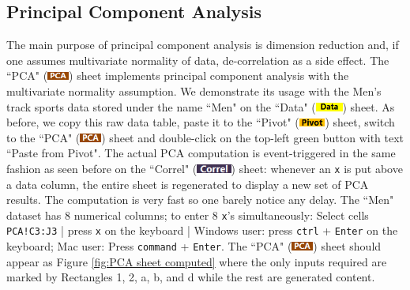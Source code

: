 \documentclass[article]{jss}
\numberwithin{equation}{subsection}
\newcommand{\shtData}{``Data" (\includegraphics[height=8pt, keepaspectratio=true]{img/DataSheetTab_png}) }
\newcommand{\shtPivot}{``Pivot" (\includegraphics[height=8pt, keepaspectratio=true]{img/PivotSheetTab_png}) }
\newcommand{\shtCorrel}{``Correl" (\includegraphics[height=8pt, keepaspectratio=true]{img/CorrelSheetTab_png}) }
\newcommand{\shtPCA}{``PCA" (\includegraphics[height=8pt, keepaspectratio=true]{img/PcaSheetTab_png}) }
\begin{document}
        \subsection[egPCA]{Principal Component Analysis}
        The main purpose of principal component analysis is dimension reduction and, if one assumes multivariate normality of data, de-correlation as a side effect. The \shtPCA sheet implements principal component analysis with the multivariate normality assumption.        
        We demonstrate its usage with the Men's track sports data stored under the name ``Men" on the \shtData sheet. As before, we copy this raw data table, paste it to the \shtPivot sheet, switch to the \shtPCA sheet and double-click on the top-left green button with text ``Paste from Pivot". The actual PCA computation is event-triggered in the same fashion as seen before on the \shtCorrel sheet: whenever an \texttt{x} is put above a data column, the entire sheet is regenerated to display a new set of PCA results. The computation is very fast so one barely notice any delay. The ``Men" dataset has 8 numerical columns; to enter 8 \texttt{x}'s simultaneously: Select cells \texttt{PCA!C3:J3} | press \texttt{x} on the keyboard | Windows user: press \texttt{ctrl} + \texttt{Enter} on the keyboard; Mac user: Press \texttt{command} + \texttt{Enter}. The \shtPCA sheet should appear as Figure \ref{fig:PCA sheet computed} where the only inputs required are marked by Rectangles 1, 2, a, b, and d while the rest are generated content.
\end{document}
